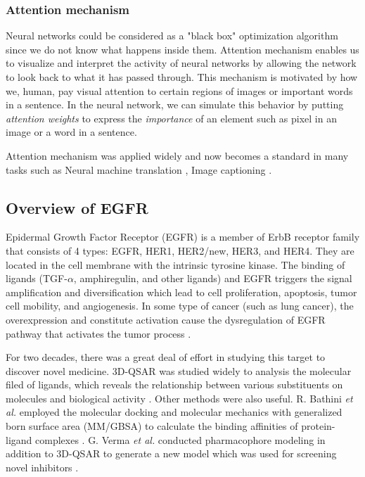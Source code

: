 \documentclass[conference]{IEEEtran}
\begin{document}
\subsubsection{Attention mechanism} 
Neural networks could be considered as a "black box" optimization algorithm since we do not know what happens inside them. Attention mechanism enables us to visualize and interpret the activity of neural networks by allowing the network to look back to what it has passed through. This mechanism is motivated by how we, human, pay visual attention to certain regions of images or important words in a sentence. In the neural network, we can simulate this behavior by putting \textit{attention weights} to express the \textit{importance} of an element such as pixel in an image or a word in a sentence.

Attention mechanism was applied widely and now becomes a standard in many tasks such as Neural machine translation \cite{VaswaniSPUJGKP17}, Image captioning \cite{Anderson201}. 
\subsection{Overview of EGFR}
Epidermal Growth Factor Receptor (EGFR) is a member of ErbB receptor family that consists of 4 types: EGFR, HER1, HER2/new, HER3, and HER4. They are located in the cell membrane with the intrinsic tyrosine kinase. The binding of ligands (TGF-$\alpha$, amphiregulin, and other ligands) and EGFR triggers the signal amplification and diversification which lead to cell proliferation, apoptosis, tumor cell mobility, and angiogenesis. In some type of cancer (such as lung cancer), the overexpression and constitute activation cause the dysregulation of EGFR pathway that activates the tumor process \cite{Scagliotti2004, Lurje2010}. 

For two decades, there was a great deal of effort in studying this target to discover novel medicine. 3D-QSAR was studied widely to analysis the molecular filed of ligands, which reveals the relationship between various substituents on molecules and biological activity \cite{Assefa2003, Kamath2003, Bathini2016, Zhao2017, Ruslin2019, Verma2016}. Other methods were also useful. R. Bathini \textit{et al.} employed the molecular docking and molecular mechanics with generalized born surface area (MM/GBSA) to calculate the binding affinities of protein-ligand complexes \cite{Bathini2016}. G. Verma \textit{et al.} conducted pharmacophore modeling in addition to 3D-QSAR to generate a new model which was used for screening novel inhibitors \cite{Verma2016}. 
\end{document}
